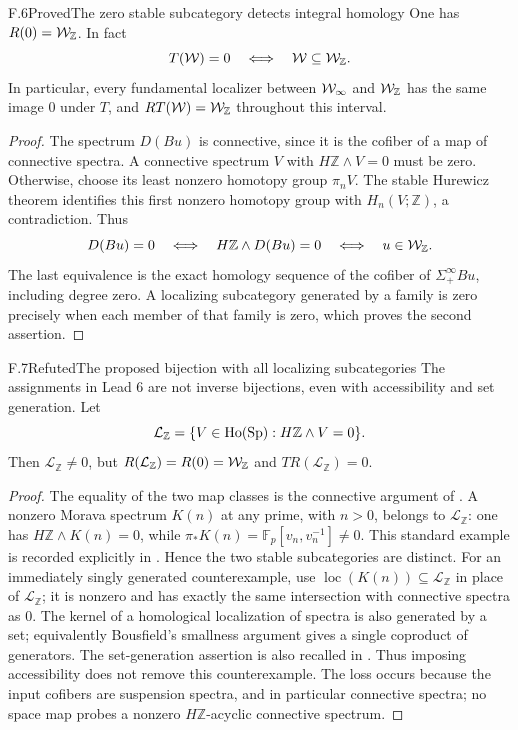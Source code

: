 \begin{claim}{F.6}{Proved}{The zero stable subcategory detects integral homology}
One has $R(0)=\mathcal{W}_{\mathbb Z}$. In fact
\[
 T(\mathcal{W})=0\quad\Longleftrightarrow\quad\mathcal{W}\subseteq\mathcal{W}_{\mathbb Z}.
\]
In particular, every fundamental localizer between $\mathcal{W}_{\infty}$ and $\mathcal{W}_{\mathbb Z}$
has the same image $0$ under $T$, and $RT(\mathcal{W})=\mathcal{W}_{\mathbb Z}$ throughout this interval.
\end{claim}
\begin{proof}
The spectrum $D(Bu)$ is connective, since it is the cofiber of a map of
connective spectra. A connective spectrum $V$ with $H\mathbb Z\wedge V=0$
must be zero. Otherwise, choose its least nonzero homotopy group
$\pi_nV$. The stable Hurewicz theorem identifies this first nonzero
homotopy group with $H_n(V;\mathbb Z)$, a contradiction. Thus
\[
 D(Bu)=0\quad\Longleftrightarrow\quad
 H\mathbb Z\wedge D(Bu)=0
 \quad\Longleftrightarrow\quad u\in\mathcal{W}_{\mathbb Z}.
\]
The last equivalence is the exact homology sequence of the cofiber of
$\Sigma^\infty_+Bu$, including degree zero. A localizing subcategory
generated by a family is zero precisely when each member of that family
is zero, which proves the second assertion.
\end{proof}

\begin{claim}{F.7}{Refuted}{The proposed bijection with all localizing subcategories}
The assignments in Lead 6 are not inverse bijections, even with
accessibility and set generation. Let
\[
 \mathcal L_{\mathbb Z}
   =\{V\in\operatorname{Ho}(\mathrm{Sp}):H\mathbb Z\wedge V=0\}.
\]
Then $\mathcal L_{\mathbb Z}\ne0$, but
$R(\mathcal L_{\mathbb Z})=R(0)=\mathcal{W}_{\mathbb Z}$ and
$TR(\mathcal L_{\mathbb Z})=0$.
\end{claim}
\begin{proof}
The equality of the two map classes is the connective argument of
. A nonzero Morava spectrum $K(n)$ at any prime, with
$n>0$, belongs to $\mathcal L_{\mathbb Z}$: one has
$H\mathbb Z\wedge K(n)=0$, while
$\pi_*K(n)=\mathbb F_p[v_n,v_n^{-1}]\ne0$.
This standard example is recorded explicitly in
\citet[Example 9.20]{FLawson2019}. Hence the two stable subcategories
are distinct. For an immediately singly generated counterexample, use
$\operatorname{loc}(K(n))\subseteq\mathcal L_{\mathbb Z}$ in place of
$\mathcal L_{\mathbb Z}$; it is nonzero and has exactly the same
intersection with connective spectra as $0$. The kernel of a
homological localization of spectra is also generated by a set;
equivalently Bousfield's smallness argument gives a
single coproduct of generators. The set-generation assertion is also
recalled in \citet[Section 2, discussion of Lemma 1.13 of Bousfield]{FHoveyPalmieri1999}.
Thus imposing accessibility does not remove this counterexample.
The loss occurs because the input cofibers are suspension spectra, and
in particular connective spectra; no space map probes a nonzero
$H\mathbb Z$-acyclic connective spectrum.
\end{proof}


